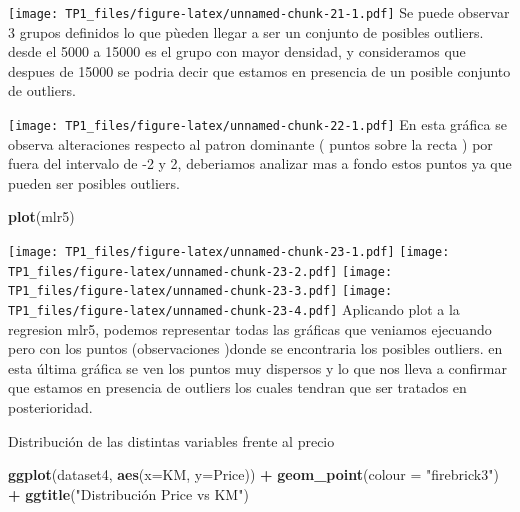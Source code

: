 \documentclass[
]{article}
\newenvironment{Shaded}{\begin{snugshade}}{\end{snugshade}}
\newcommand{\DataTypeTok}[1]{\textcolor[rgb]{0.13,0.29,0.53}{#1}}
\newcommand{\DecValTok}[1]{\textcolor[rgb]{0.00,0.00,0.81}{#1}}
\newcommand{\KeywordTok}[1]{\textcolor[rgb]{0.13,0.29,0.53}{\textbf{#1}}}
\newcommand{\NormalTok}[1]{#1}
\newcommand{\OperatorTok}[1]{\textcolor[rgb]{0.81,0.36,0.00}{\textbf{#1}}}
\newcommand{\StringTok}[1]{\textcolor[rgb]{0.31,0.60,0.02}{#1}}
\begin{document}
\texttt{[image: TP1\_files/figure-latex/unnamed-chunk-21-1.pdf]} Se puede
observar 3 grupos definidos lo que pùeden llegar a ser un conjunto de
posibles outliers. desde el 5000 a 15000 es el grupo con mayor densidad,
y consideramos que despues de 15000 se podria decir que estamos en
presencia de un posible conjunto de outliers.

\begin{Shaded}
\end{Shaded}

\texttt{[image: TP1\_files/figure-latex/unnamed-chunk-22-1.pdf]} En esta
gráfica se observa alteraciones respecto al patron dominante ( puntos
sobre la recta ) por fuera del intervalo de -2 y 2, deberiamos analizar
mas a fondo estos puntos ya que pueden ser posibles outliers.

\begin{Shaded}
\begin{Highlighting}[]
\KeywordTok{plot}\NormalTok{(mlr5)}
\end{Highlighting}
\end{Shaded}

\texttt{[image: TP1\_files/figure-latex/unnamed-chunk-23-1.pdf]}
\texttt{[image: TP1\_files/figure-latex/unnamed-chunk-23-2.pdf]}
\texttt{[image: TP1\_files/figure-latex/unnamed-chunk-23-3.pdf]}
\texttt{[image: TP1\_files/figure-latex/unnamed-chunk-23-4.pdf]}
Aplicando plot a la regresion mlr5, podemos representar todas las
gráficas que veniamos ejecuando pero con los puntos (observaciones
)donde se encontraria los posibles outliers. en esta última gráfica se
ven los puntos muy dispersos y lo que nos lleva a confirmar que estamos
en presencia de outliers los cuales tendran que ser tratados en
posterioridad.

Distribución de las distintas variables frente al precio

\begin{Shaded}
\begin{Highlighting}[]
\KeywordTok{ggplot}\NormalTok{(dataset4, }\KeywordTok{aes}\NormalTok{(}\DataTypeTok{x=}\NormalTok{KM, }\DataTypeTok{y=}\NormalTok{Price)) }\OperatorTok{+}\StringTok{ }\KeywordTok{geom_point}\NormalTok{(}\DataTypeTok{colour =} \StringTok{"firebrick3"}\NormalTok{) }\OperatorTok{+}
\StringTok{        }\KeywordTok{ggtitle}\NormalTok{(}\StringTok{"Distribución Price vs KM"}\NormalTok{)}
\end{Highlighting}
\end{Shaded}
\end{document}
